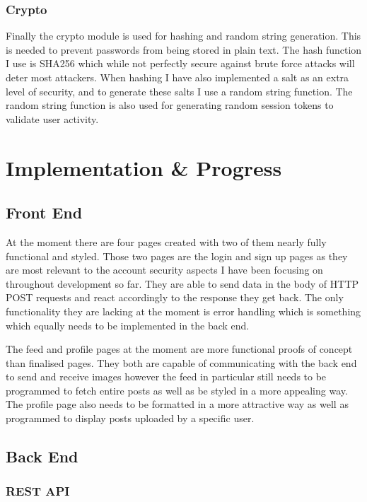 \documentclass[]{final_report}
\begin{document}
\subsection{Crypto}
Finally the crypto module is used for hashing and random string generation. This is needed to prevent passwords from being stored in plain text. The hash function I use is SHA256 which while not perfectly secure against brute force attacks will deter most attackers. When hashing I have also implemented a salt as an extra level of security, and to generate these salts I use a random string function. The random string function is also used for generating random session tokens to validate user activity.

\chapter{Implementation \& Progress}

\section{Front End}

At the moment there are four pages created with two of them nearly fully functional and styled. Those two pages are the login and sign up pages as they are most relevant to the account security aspects I have been focusing on throughout development so far. They are able to send data in the body of HTTP POST requests and react accordingly to the response they get back. The only functionality they are lacking at the moment is error handling which is something which equally needs to be implemented in the back end.

The feed and profile pages at the moment are more functional proofs of concept than finalised pages. They both are capable of communicating with the back end to send and receive images however the feed in particular still needs to be programmed to fetch entire posts as well as be styled in a more appealing way. The profile page also needs to be formatted in a more attractive way as well as programmed to display posts uploaded by a specific user.

\section{Back End}

\subsection{REST API}
\end{document}
